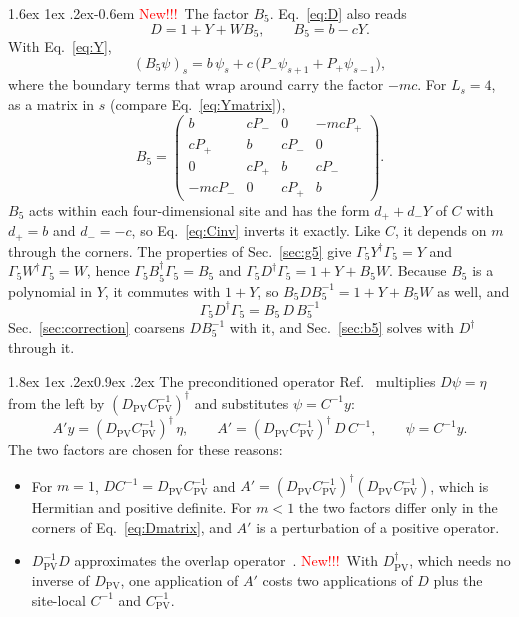 \documentclass[11pt,a4paper]{article}
\makeatletter
\newif\ifshownew \shownewtrue
\DeclareRobustCommand\New{\ifshownew\textcolor{red}{New!!!}\ \else\ignorespaces\fi}
\renewcommand\subsubsection{\@startsection{subsubsection}{3}{\z@}%
  {1.8ex \@plus 1ex \@minus .2ex}{0.9ex \@plus .2ex}%
  {\centering\normalfont\small\bfseries\itshape}}
\renewcommand\paragraph{\@startsection{paragraph}{4}{\z@}%
  {1.6ex \@plus 1ex \@minus .2ex}{-0.6em}%
  {\normalfont\normalsize\itshape}}
\numberwithin{equation}{section}
\newcommand{\dg}{^{\dagger}}
\newcommand{\Dpv}{D_{\mathrm{PV}}}
\newcommand{\Cpv}{C_{\mathrm{PV}}}
\newcommand{\Pp}{P_{+}}
\newcommand{\Pm}{P_{-}}
\newcommand{\Gfive}{\Gamma_5}
\makeatother
\begin{document}
\paragraph{\New The factor $B_5$.} Eq.~\eqref{eq:D} also reads
\begin{equation}
D=1+Y+W B_5,\qquad B_5=b-cY .
\label{eq:DB5}
\end{equation}
With Eq.~\eqref{eq:Y},
\begin{equation}
(B_5\psi)_s=b\,\psi_s+c\,\big(\Pm\psi_{s+1}+\Pp\psi_{s-1}\big),
\end{equation}
where the boundary terms that wrap around carry the factor $-mc$. For $L_s=4$, as a matrix in $s$
(compare Eq.~\eqref{eq:Ymatrix}),
\begin{equation}
B_5=\begin{pmatrix}
b & c\Pm & 0 & -mc\Pp\\
c\Pp & b & c\Pm & 0\\
0 & c\Pp & b & c\Pm\\
-mc\Pm & 0 & c\Pp & b
\end{pmatrix}.
\label{eq:B5matrix}
\end{equation}
$B_5$ acts within each four-dimensional site and has the form $d_++d_-Y$ of $C$ with $d_+=b$ and
$d_-=-c$, so Eq.~\eqref{eq:Cinv} inverts it exactly. Like $C$, it depends on $m$ through the
corners. The properties of Sec.~\ref{sec:g5} give $\Gfive Y\dg\Gfive=Y$ and
$\Gfive W\dg\Gfive=W$, hence $\Gfive B_5\dg\Gfive=B_5$ and $\Gfive D\dg\Gfive=1+Y+B_5W$. Because
$B_5$ is a polynomial in $Y$, it commutes with $1+Y$, so $B_5DB_5^{-1}=1+Y+B_5W$ as well, and
\begin{equation}
\boxed{\;\Gfive D\dg\Gfive=B_5\,D\,B_5^{-1}\;}
\label{eq:b5sim}
\end{equation}
Sec.~\ref{sec:correction} coarsens $DB_5^{-1}$ with it, and Sec.~\ref{sec:b5} solves with $D\dg$
through it.

\subsubsection{The preconditioned operator}
Ref.~\cite{KCM2024} multiplies $D\psi=\eta$
from the left by $(\Dpv\Cpv^{-1})\dg$ and substitutes $\psi=C^{-1}y$:
\begin{equation}
A'y=(\Dpv\Cpv^{-1})\dg\,\eta,\qquad A'=(\Dpv\Cpv^{-1})\dg\,D\,C^{-1},\qquad \psi=C^{-1}y .
\label{eq:Aprime}
\end{equation}
The two factors are chosen for these reasons:
\begin{itemize}
\item For $m=1$, $DC^{-1}=\Dpv\Cpv^{-1}$ and $A'=(\Dpv\Cpv^{-1})\dg(\Dpv\Cpv^{-1})$, which is
Hermitian and positive definite. For $m<1$ the two factors differ only in the corners of
Eq.~\eqref{eq:Dmatrix}, and $A'$ is a perturbation of a positive operator.
\item $\Dpv^{-1}D$ approximates the overlap operator~\cite{BCHW}. \New With $\Dpv\dg$, which needs no inverse of $\Dpv$,
one application of $A'$ costs two applications of $D$ plus the
site-local $C^{-1}$ and $\Cpv^{-1}$.
\end{itemize}
\end{document}
